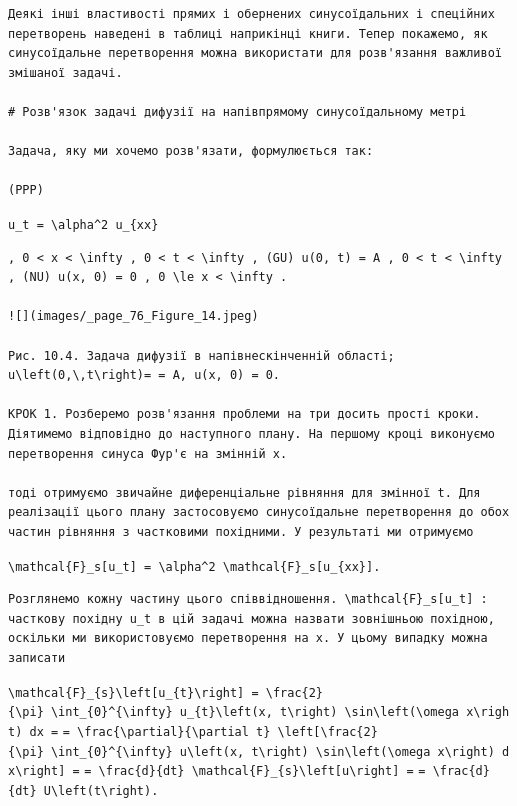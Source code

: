 \documentclass[
  ukrainian,
]{article}
\begin{document}
\begin{verbatim}
Деякі інші властивості прямих і обернених синусоїдальних і спеційних перетворень наведені в таблиці наприкінці книги. Тепер покажемо, як синусоїдальне перетворення можна використати для розв'язання важливої змішаної задачі.

# Розв'язок задачі дифузії на напівпрямому синусоїдальному метрі

Задача, яку ми хочемо розв'язати, формулюється так:

(PPP)
\end{verbatim}

\texttt{u\_t\ =\ \textbackslash{}alpha\^{}2\ u\_\{xx\}}

\begin{verbatim}
, 0 < x < \infty , 0 < t < \infty , (GU) u(0, t) = A , 0 < t < \infty , (NU) u(x, 0) = 0 , 0 \le x < \infty .

![](images/_page_76_Figure_14.jpeg)

Рис. 10.4. Задача дифузії в напівнескінченній області; u\left(0,\,t\right)= = A, u(x, 0) = 0.

КРОК 1. Розберемо розв'язання проблеми на три досить прості кроки. Діятимемо відповідно до наступного плану. На першому кроці виконуємо перетворення синуса Фур'є на змінній x.

тоді отримуємо звичайне диференціальне рівняння для змінної t. Для реалізації цього плану застосовуємо синусоїдальне перетворення до обох частин рівняння з частковими похідними. У результаті ми отримуємо
\end{verbatim}

\texttt{\textbackslash{}mathcal\{F\}\_s{[}u\_t{]}\ =\ \textbackslash{}alpha\^{}2\ \textbackslash{}mathcal\{F\}\_s{[}u\_\{xx\}{]}.}

\begin{verbatim}
Розглянемо кожну частину цього співвідношення. \mathcal{F}_s[u_t] : часткову похідну u_t в цій задачі можна назвати зовнішньою похідною, оскільки ми використовуємо перетворення на x. У цьому випадку можна записати
\end{verbatim}

\texttt{\textbackslash{}mathcal\{F\}\_\{s\}\textbackslash{}left{[}u\_\{t\}\textbackslash{}right{]}\ =\ \textbackslash{}frac\{2\}\{\textbackslash{}pi\}\ \textbackslash{}int\_\{0\}\^{}\{\textbackslash{}infty\}\ u\_\{t\}\textbackslash{}left(x,\ t\textbackslash{}right)\ \textbackslash{}sin\textbackslash{}left(\textbackslash{}omega\ x\textbackslash{}right)\ dx\ =}
\texttt{=\ \textbackslash{}frac\{\textbackslash{}partial\}\{\textbackslash{}partial\ t\}\ \textbackslash{}left{[}\textbackslash{}frac\{2\}\{\textbackslash{}pi\}\ \textbackslash{}int\_\{0\}\^{}\{\textbackslash{}infty\}\ u\textbackslash{}left(x,\ t\textbackslash{}right)\ \textbackslash{}sin\textbackslash{}left(\textbackslash{}omega\ x\textbackslash{}right)\ dx\textbackslash{}right{]}\ =}
\texttt{=\ \textbackslash{}frac\{d\}\{dt\}\ \textbackslash{}mathcal\{F\}\_\{s\}\textbackslash{}left{[}u\textbackslash{}right{]}\ =}
\texttt{=\ \textbackslash{}frac\{d\}\{dt\}\ U\textbackslash{}left(t\textbackslash{}right).}
\end{document}
